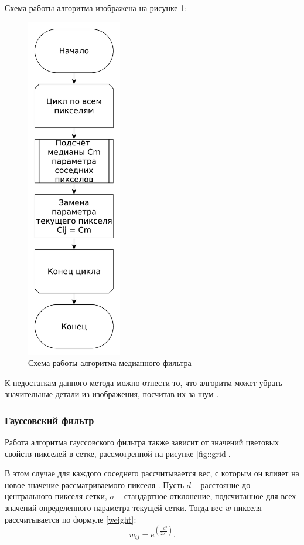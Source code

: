 \newpage
Схема работы алгоритма изображена на рисунке \ref{fig::median}:
\FloatBarrier
\begin{figure}[h]	
	\begin{center}
		\includegraphics[height=15cm]{inc/pdf/median.pdf}
	\end{center}
	\captionsetup{justification=centering}
	\caption{Схема работы алгоритма медианного фильтра}
	\label{fig::median}
\end{figure}
\FloatBarrier

К недостаткам данного метода можно отнести то, что алгоритм может убрать значительные детали из изображения, посчитав их за шум \cite{median2}. 


\subsubsection{Гауссовский фильтр}
Работа алгоритма гауссовского фильтра также зависит от значений цветовых свойств пикселей в сетке, рассмотренной на рисунке \ref{fig::grid}.

В этом случае для каждого соседнего рассчитывается вес, с которым он влияет на новое значение рассматриваемого пикселя  \cite{filterTechincs}. 
Пусть $d$ -- расстояние до центрального пикселя сетки, $\sigma$ -- стандартное отклонение, подсчитанное для всех значений определенного параметра текущей сетки.
Тогда вес $w$ пикселя рассчитывается по формуле \ref{weight}:
\begin{equation}
	\label{weight}
	w_{ij} = e^{\left(\frac{-d^2}{2\sigma^2}\right)}.
\end{equation}

